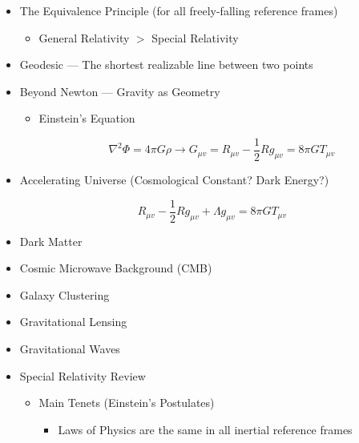 \begin{itemize}

  \item The Equivalence Principle (for all freely-falling reference frames)

    \begin{itemize}

      \item General Relativity $>$ Special Relativity

    \end{itemize}

  \item Geodesic — The shortest realizable line between two points

  \item Beyond Newton — Gravity as Geometry

    \begin{itemize}

      \item Einstein's Equation

        $$\nabla^2\Phi=4\pi G\rho\to G_{\mu v}=R_{\mu v}-\frac{1}{2}Rg_{\mu v}=8\pi GT_{\mu v}$$

    \end{itemize}

  \item Accelerating Universe (Cosmological Constant? Dark Energy?)

    $$R_{\mu v}-\frac{1}{2} Rg_{\mu v}+\Lambda g_{\mu v}=8\pi GT_{\mu v}$$

  \item Dark Matter

  \item Cosmic Microwave Background (CMB)

  \item Galaxy Clustering

  \item Gravitational Lensing

  \item Gravitational Waves

  \item Special Relativity Review

    \begin{itemize}

      \item Main Tenets (Einstein's Postulates)

        \begin{itemize}

          \item Laws of Physics are the same in all inertial reference frames
    

\end{itemize}
\end{itemize}
\end{itemize}
